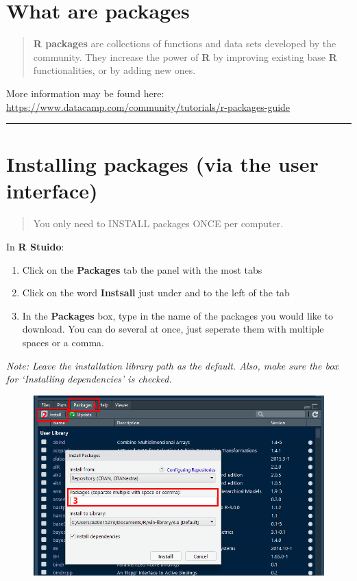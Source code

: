 \documentclass[]{book}
\providecommand{\tightlist}{%
  \setlength{\itemsep}{0pt}\setlength{\parskip}{0pt}}
\theoremstyle{definition}
\theoremstyle{definition}
\theoremstyle{definition}
\theoremstyle{remark}
\begin{document}
\section{What are packages}\label{what-are-packages}

\begin{quote}
\textbf{R packages} are collections of functions and data sets developed
by the community. They increase the power of \textbf{R} by improving
existing base \textbf{R} functionalities, or by adding new ones.
\end{quote}

More information may be found here:
\url{https://www.datacamp.com/community/tutorials/r-packages-guide}

\begin{center}\rule{0.5\linewidth}{\linethickness}\end{center}

\section{Installing packages (via the user
interface)}\label{installing-packages-via-the-user-interface}

\begin{quote}
You only need to INSTALL packages ONCE per computer.
\end{quote}

In \textbf{R Stuido}:

\begin{enumerate}
\def\labelenumi{\arabic{enumi}.}
\tightlist
\item
  Click on the \textbf{Packages} tab the panel with the most tabs
\item
  Click on the word \textbf{Instsall} just under and to the left of the
  tab
\item
  In the \textbf{Packages} box, type in the name of the packages you
  would like to download. You can do several at once, just seperate them
  with multiple spaces or a comma.
\end{enumerate}

\emph{Note: Leave the installation library path as the default. Also,
make sure the box for `Installing dependencies' is checked.}

\begin{figure}
\centering
\includegraphics{img/Install_Package_Screenshot.png}
\caption{}
\end{figure}
\end{document}
